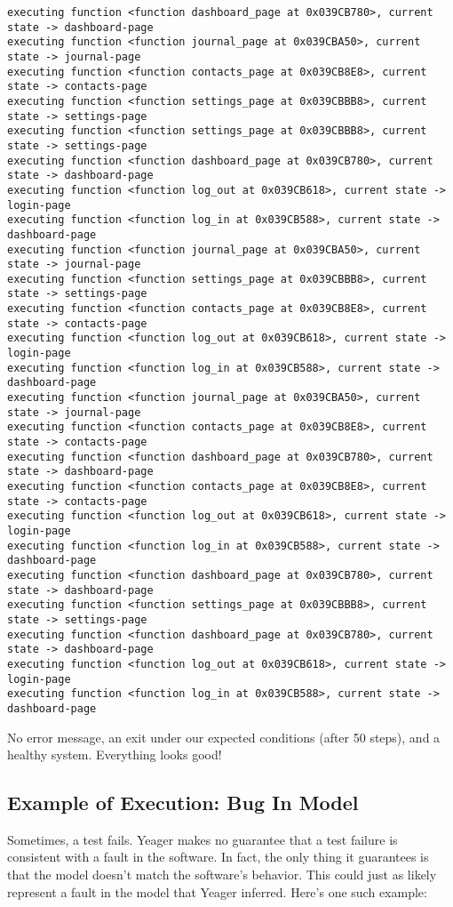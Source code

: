 {\begin{verbatim}
executing function <function dashboard_page at 0x039CB780>, current state -> dashboard-page
executing function <function journal_page at 0x039CBA50>, current state -> journal-page
executing function <function contacts_page at 0x039CB8E8>, current state -> contacts-page
executing function <function settings_page at 0x039CBBB8>, current state -> settings-page
executing function <function settings_page at 0x039CBBB8>, current state -> settings-page
executing function <function dashboard_page at 0x039CB780>, current state -> dashboard-page
executing function <function log_out at 0x039CB618>, current state -> login-page
executing function <function log_in at 0x039CB588>, current state -> dashboard-page
executing function <function journal_page at 0x039CBA50>, current state -> journal-page
executing function <function settings_page at 0x039CBBB8>, current state -> settings-page
executing function <function contacts_page at 0x039CB8E8>, current state -> contacts-page
executing function <function log_out at 0x039CB618>, current state -> login-page
executing function <function log_in at 0x039CB588>, current state -> dashboard-page
executing function <function journal_page at 0x039CBA50>, current state -> journal-page
executing function <function contacts_page at 0x039CB8E8>, current state -> contacts-page
executing function <function dashboard_page at 0x039CB780>, current state -> dashboard-page
executing function <function contacts_page at 0x039CB8E8>, current state -> contacts-page
executing function <function log_out at 0x039CB618>, current state -> login-page
executing function <function log_in at 0x039CB588>, current state -> dashboard-page
executing function <function dashboard_page at 0x039CB780>, current state -> dashboard-page
executing function <function settings_page at 0x039CBBB8>, current state -> settings-page
executing function <function dashboard_page at 0x039CB780>, current state -> dashboard-page
executing function <function log_out at 0x039CB618>, current state -> login-page
executing function <function log_in at 0x039CB588>, current state -> dashboard-page
\end{verbatim}}

No error message, an exit under our expected conditions (after 50 steps), and a healthy system. Everything looks good!

\subsection{Example of Execution: Bug In Model}
Sometimes, a test fails. Yeager makes no guarantee that a test failure is consistent with a fault in the software. In fact, the only thing it guarantees is that the model doesn't match the software's behavior. This could just as likely represent a fault in the model that Yeager inferred. Here's one such example:

